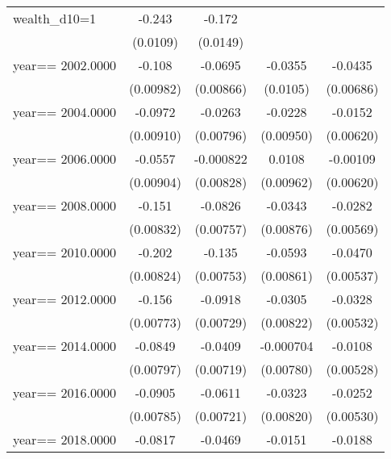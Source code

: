 \begin{table}[htbp]
\begin{tabular}{l*{4}{c}}
\addlinespace
wealth\_d10=1    &   -0.243\sym{***}&   -0.172\sym{***}&                  &                  \\
                & (0.0109)         & (0.0149)         &                  &                  \\
\addlinespace
year==  2002.0000&   -0.108\sym{***}&  -0.0695\sym{***}&  -0.0355\sym{***}&  -0.0435\sym{***}\\
                &(0.00982)         &(0.00866)         & (0.0105)         &(0.00686)         \\
\addlinespace
year==  2004.0000&  -0.0972\sym{***}&  -0.0263\sym{***}&  -0.0228\sym{**} &  -0.0152\sym{**} \\
                &(0.00910)         &(0.00796)         &(0.00950)         &(0.00620)         \\
\addlinespace
year==  2006.0000&  -0.0557\sym{***}&-0.000822         &   0.0108         & -0.00109         \\
                &(0.00904)         &(0.00828)         &(0.00962)         &(0.00620)         \\
\addlinespace
year==  2008.0000&   -0.151\sym{***}&  -0.0826\sym{***}&  -0.0343\sym{***}&  -0.0282\sym{***}\\
                &(0.00832)         &(0.00757)         &(0.00876)         &(0.00569)         \\
\addlinespace
year==  2010.0000&   -0.202\sym{***}&   -0.135\sym{***}&  -0.0593\sym{***}&  -0.0470\sym{***}\\
                &(0.00824)         &(0.00753)         &(0.00861)         &(0.00537)         \\
\addlinespace
year==  2012.0000&   -0.156\sym{***}&  -0.0918\sym{***}&  -0.0305\sym{***}&  -0.0328\sym{***}\\
                &(0.00773)         &(0.00729)         &(0.00822)         &(0.00532)         \\
\addlinespace
year==  2014.0000&  -0.0849\sym{***}&  -0.0409\sym{***}&-0.000704         &  -0.0108\sym{**} \\
                &(0.00797)         &(0.00719)         &(0.00780)         &(0.00528)         \\
\addlinespace
year==  2016.0000&  -0.0905\sym{***}&  -0.0611\sym{***}&  -0.0323\sym{***}&  -0.0252\sym{***}\\
                &(0.00785)         &(0.00721)         &(0.00820)         &(0.00530)         \\
\addlinespace
year==  2018.0000&  -0.0817\sym{***}&  -0.0469\sym{***}&  -0.0151\sym{*}  &  -0.0188\sym{***}\\

\end{tabular}
\end{table}
